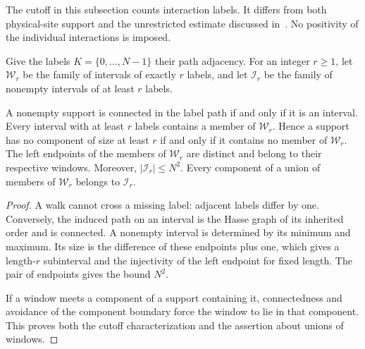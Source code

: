 The cutoff in this subsection counts interaction labels. It differs from
both physical-site support and the unrestricted estimate discussed
in~\cite{gap:alvv16_cluster_approximation}. No positivity of the individual
interactions is imposed.

\begin{definition}
    \label{def:cluster_label_intervals}
    \leanok
    Give the labels $K=\{0,\ldots,N-1\}$ their path adjacency. For an integer
    $r\geq1$, let $\mathcal W_r$ be the family of intervals of exactly $r$
    labels, and let $\mathcal I_r$ be the family of nonempty intervals of
    at least $r$ labels.
\end{definition}

\begin{lemma}
    \label{thm:cluster_label_window_geometry}
    \leanok
    A nonempty support is connected in the label path if and only if it is
    an interval. Every interval with at least $r$ labels contains a member
    of $\mathcal W_r$. Hence a support has no component of size at least
    $r$ if and only if it contains no member of $\mathcal W_r$.
    The left endpoints of the members of $\mathcal W_r$ are distinct and
    belong to their respective windows. Moreover, $|\mathcal I_r|\leq N^2$.
    Every component of a union of members of $\mathcal W_r$ belongs to
    $\mathcal I_r$.
\end{lemma}
\begin{proof}\leanok
    A walk cannot cross a missing label: adjacent labels differ by one.
    Conversely, the induced path on an interval is the Hasse graph of its
    inherited order and is connected. A nonempty interval is determined
    by its minimum and maximum. Its size is the difference of these
    endpoints plus one, which gives a length-$r$ subinterval and the
    injectivity of the left endpoint for fixed length. The pair of
    endpoints gives the bound $N^2$.

    If a window meets a component of a support containing it, connectedness
    and avoidance of the component boundary force the window to lie in
    that component. This proves both the cutoff characterization and
    the assertion about unions of windows.
\end{proof}

